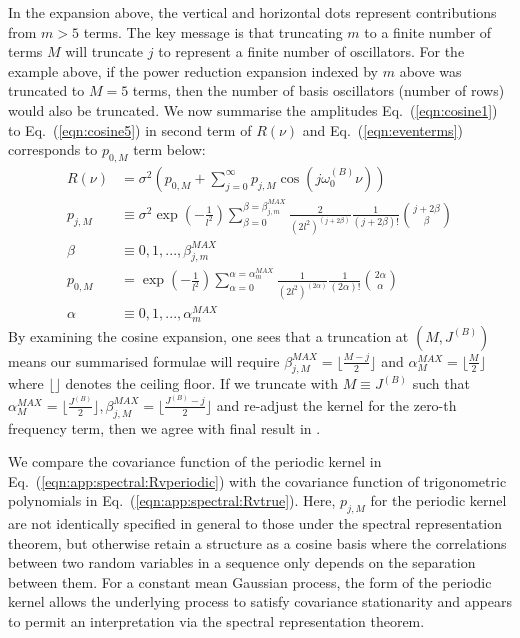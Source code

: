 In the expansion above, the vertical and horizontal dots represent contributions from $m>5$ terms. The key message is that truncating $m$ to a finite number of terms $M$ will   truncate $j$ to represent a finite number of oscillators. For the example above, if the power reduction expansion indexed by $m$ above was truncated to $M=5$ terms, then the  number of basis oscillators (number of rows) would also be truncated.  We now summarise the amplitudes Eq.~(\ref {eqn:cosine1}) to  Eq.~(\ref {eqn:cosine5}) in second term of $R(\nu)$ and  Eq.~(\ref {eqn:eventerms}) corresponds to $p_{0,M}$ term below:
\begin{align}
R(\nu) &= \sigma^2 (p_{0,M} + \sum_{j=0}^{\infty} p_{j,M} \cos(j\omega_0^{(B)}  \nu)) \label{eqn:app:spectral:Rvperiodic}\\
p_{j,M} & \equiv \sigma^2 \exp (- \frac{1}{l^2}) \sum_{\beta = 0}^{\beta = \beta_{j,m}^{MAX}} \frac{2}{(2l^2)^{(j + 2\beta)}} \frac{1}{(j + 2\beta)!} \binom{j + 2\beta}{\beta} \label{eqn:beta_series2} \\
\beta &\equiv  0,1,..., \beta_{j,m}^{MAX}  \\
p_{0,M} &= \exp (- \frac{1}{l^2}) \sum_{\alpha = 0}^{\alpha = \alpha_{m}^{MAX}} \frac{1}{(2l^2)^{(2\alpha)}} \frac{1}{(2\alpha)!} \binom{2\alpha}{\alpha} \label{eqn:alpha_series}\\
\alpha &\equiv  0,1,..., \alpha_{m}^{MAX} 
\end{align}
By examining the cosine expansion, one sees that a truncation at $(M, J^{(B)} )$ means our summarised formulae will require $\beta_{j,M}^{MAX} = \lfloor\frac{M-j}{2}\rfloor$ and $\alpha_{M}^{MAX} = \lfloor\frac{M}{2}\rfloor$  where $\lfloor \rfloor$ denotes the ceiling floor. If we truncate with $M \equiv J^{(B)} $ such that $\alpha_{M}^{MAX} = \lfloor\frac{J^{(B)} }{2}\rfloor, \beta_{j,M}^{MAX} =  \lfloor\frac{J^{(B)}-j}{2}\rfloor $ and re-adjust the kernel for the zero-th frequency term, then we agree with final result in \cite{solin2014explicit}.

We compare the covariance function of the periodic kernel in Eq.~(\ref {eqn:app:spectral:Rvperiodic}) with the covariance function of trigonometric polynomials in Eq.~(\ref {eqn:app:spectral:Rvtrue}).  Here, $p_{j,M}$ for the periodic kernel are not identically specified in general to those under the spectral representation theorem, but otherwise retain a structure as a cosine basis where the correlations between two random variables in a sequence only depends on the separation between them. For a constant mean Gaussian process, the form of the periodic kernel allows the underlying process to satisfy covariance stationarity and appears to permit an interpretation via the spectral representation theorem.


